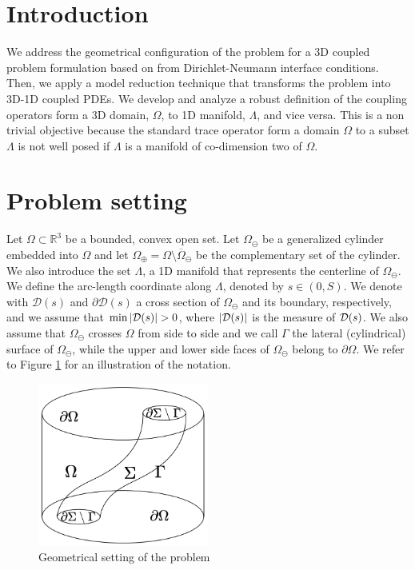 \documentclass[r]{siamart171218}
\begin{document}
\section{Introduction}\label{sec:intro}

We address the geometrical configuration of the problem for a 3D coupled problem formulation based on from Dirichlet-Neumann interface conditions. Then, we apply a model reduction technique that transforms the problem into 3D-1D coupled PDEs. We develop and analyze a robust definition of the coupling operators form a 3D domain, $\Omega$, to 1D manifold, $\Lambda$, and vice versa. This is a non trivial objective because the standard trace operator form a domain $\Omega$ to a subset $\Lambda$ is not well posed if $\Lambda$ is a manifold of co-dimension two of $\Omega$.

\section{Problem setting}\label{sec:setting}

Let $\Omega \subset \mathbb{R}^3$ be a bounded, convex open set. Let $\Omega_\ominus$ be a generalized cylinder embedded into $\Omega$ and let $\Omega_\oplus = \Omega \setminus \overline{\Omega}_\ominus$ be the complementary set of the cylinder. We also introduce the set $\Lambda$, a 1D manifold that represents the centerline of $\Omega_\ominus$. We define the arc-length coordinate along $\Lambda$, denoted by $s \in (0,S)$. We denote with $\mathcal{D}(s)$ and $\partial\mathcal{D}(s)$ a cross section of $\Omega_\ominus$ and its boundary, respectively, and we assume that $\min |\mathcal{D} (s)| >0$, where $|\mathcal{D} (s)|$ is the measure of $\mathcal{D} (s)$. 
We also assume that $\Omega_\ominus$ crosses $\Omega$ from side to side and we call $\Gamma$ the lateral (cylindrical) surface of $\Omega_\ominus$, while the upper and lower side faces of $\Omega_\ominus$ belong to $\partial\Omega$. We refer to Figure \ref{fig1} for an illustration of the notation. 

\begin{figure}
\begin{center}
\includegraphics[width=0.5\textwidth]{3D-1D-simple.png}
\end{center}
\caption{Geometrical setting of the problem}
\label{fig1}
\end{figure}
\end{document}
